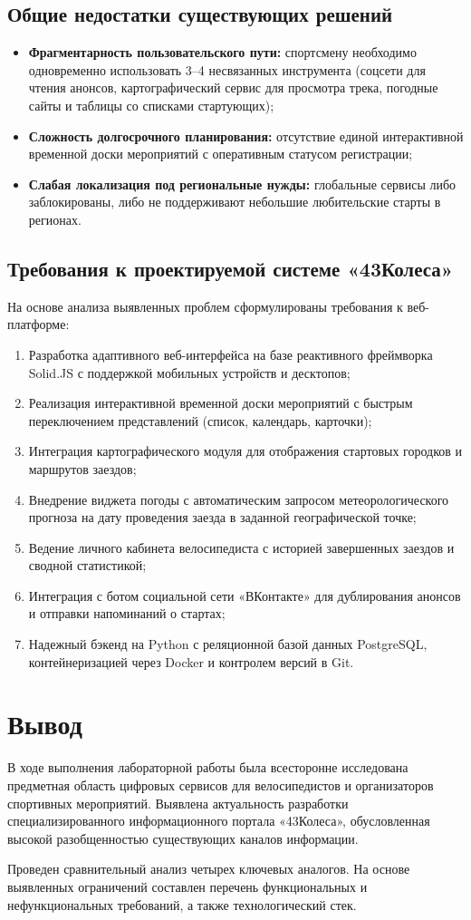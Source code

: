 \documentclass[oneside,a4paper,14pt]{extarticle}
\begin{document}
\subsection{Общие недостатки существующих решений}
\begin{itemize}
	\item \textbf{Фрагментарность пользовательского пути:} спортсмену необходимо одновременно использовать 3--4 несвязанных инструмента (соцсети для чтения анонсов, картографический сервис для просмотра трека, погодные сайты и таблицы со списками стартующих);
	\item \textbf{Сложность долгосрочного планирования:} отсутствие единой интерактивной временной доски мероприятий с оперативным статусом регистрации;
	\item \textbf{Слабая локализация под региональные нужды:} глобальные сервисы либо заблокированы, либо не поддерживают небольшие любительские старты в регионах.
\end{itemize}

\subsection{Требования к проектируемой системе «43Колеса»}
На основе анализа выявленных проблем сформулированы требования к веб-платформе:
\begin{enumerate}
	\item Разработка адаптивного веб-интерфейса на базе реактивного фреймворка Solid.JS с поддержкой мобильных устройств и десктопов;
	\item Реализация интерактивной временной доски мероприятий с быстрым переключением представлений (список, календарь, карточки);
	\item Интеграция картографического модуля для отображения стартовых городков и маршрутов заездов;
	\item Внедрение виджета погоды с автоматическим запросом метеорологического прогноза на дату проведения заезда в заданной географической точке;
	\item Ведение личного кабинета велосипедиста с историей завершенных заездов и сводной статистикой;
	\item Интеграция с ботом социальной сети «ВКонтакте» для дублирования анонсов и отправки напоминаний о стартах;
	\item Надежный бэкенд на Python с реляционной базой данных PostgreSQL, контейнеризацией через Docker и контролем версий в Git.
\end{enumerate}

\section{Вывод}

В ходе выполнения лабораторной работы была всесторонне исследована предметная область цифровых сервисов для велосипедистов и организаторов спортивных мероприятий. Выявлена актуальность разработки специализированного информационного портала «43Колеса», обусловленная высокой разобщенностью существующих каналов информации.

Проведен сравнительный анализ четырех ключевых аналогов. На основе выявленных ограничений составлен перечень функциональных и нефункциональных требований, а также технологический стек.
\end{document}
